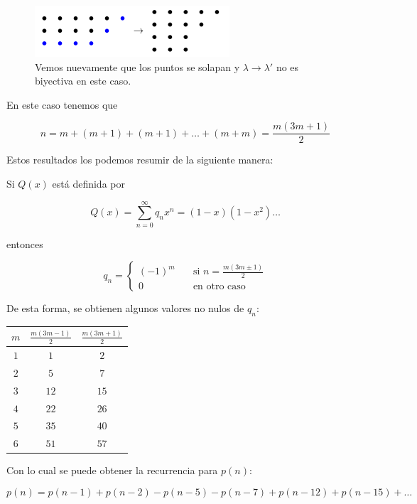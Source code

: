 \begin{figure}
    \centering
    \includegraphics[scale=0.65]{img/ferrers8.png}
    \caption{Vemos nuevamente que los puntos se solapan y $\lambda \rightarrow \lambda'$ no es biyectiva en este caso.}
    \label{fig:ferrers8}
\end{figure}

En este caso tenemos que

\[
n = m + (m+1) + (m+1) + \dots + (m+m) = \frac{m(3m+1)}{2}
\]

Estos resultados los podemos resumir de la siguiente manera:

\begin{teo}
    Si $Q(x)$ está definida por
    
    \[
    Q(x) = \sum_{n=0}^{\infty} q_nx^n = (1-x)(1-x^2)\dots
    \]
    
    \noindent entonces
    
    \[
    q_n = \begin{cases}
              (-1)^m \quad &\text{si $\displaystyle n = \frac{m(3m \pm 1)}{2}$} \\
              0 \quad &\text{en otro caso}
          \end{cases}
    \]
\end{teo}

De esta forma, se obtienen algunos valores no nulos de $q_n$:

\begin{center}
    \begin{tabular}{ccc}
        $m$ & $\displaystyle \frac{m(3m-1)}{2}$ & $\displaystyle \frac{m(3m+1)}{2}$ \\ \toprule
        $1$ & $1$ & $2$ \\
        $2$ & $5$ & $7$ \\
        $3$ & $12$ & $15$ \\
        $4$ & $22$ & $26$ \\
        $5$ & $35$ & $40$ \\
        $6$ & $51$ & $57$
    \end{tabular}
\end{center}

Con lo cual se puede obtener la recurrencia para $p(n)$:

\[
p(n) = p(n-1) + p(n-2) - p(n-5) - p(n-7) + p(n-12) + p(n-15) + \dots
\]